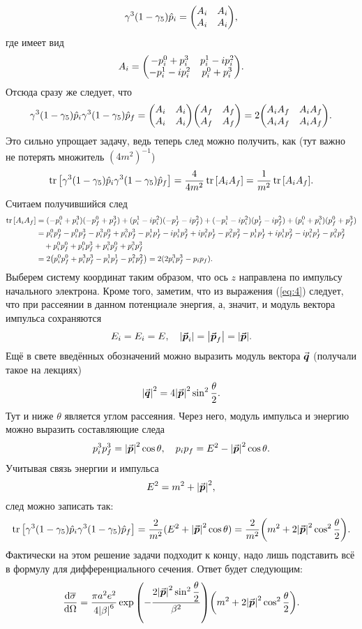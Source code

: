 \documentclass[12pt]{article}
\begin{document}
	$$ \gamma^3(1-\gamma_5)\hat{p}_i = \mqty(A_i & A_i \\ A_i & A_i), $$
	где имеет вид
	$$ A_i = \mqty(-p^0_i + p^3_i & p^1_i - ip^2_i \\ -p^1_i - ip^2_i & p^0_i + p^3_i).$$
	Отсюда сразу же следует, что 
	$$ \gamma^3(1-\gamma_5)\hat{p}_i \gamma^3(1-\gamma_5)\hat{p}_f = \mqty(A_i & A_i \\ A_i & A_i) \mqty(A_f & A_f \\ A_f & A_f) = 2 \mqty(A_i A_f &A_i A_f \\ A_i A_f & A_i A_f).$$
	Это сильно упрощает задачу, ведь теперь след можно получить, как (тут важно не потерять множитель $(4m^2)^{-1}$)
	$$ \tr\qty[\gamma^3(1-\gamma_5)\hat{p}_i \gamma^3(1-\gamma_5)\hat{p}_f] = \dfrac{4}{4m^2} \tr\qty[A_i A_f] = \dfrac{1}{m^2}\tr\qty[A_i A_f]. $$
	Считаем получившийся след 
	\begin{equation*}
		\begin{split}
			\tr\qty[A_i A_f] &= (-p^0_i + p^3_i) (-p^0_f + p^3_f) + (p^1_i - ip^2_i) (-p^1_f - ip^2_f) + (-p^1_i - ip^2_i) (p^1_f - ip^2_f) + (p^0_i + p^3_i) (p^0_f + p^3_f)\\
			&= p^0_i p^0_f - p^0_i p^3_f - p^3_i p^0_f + p^3_i p^3_f - p^1_i p^1_f - i p^1_i p^2_f + i p^2_i p^1_f - p^2_i p^2_f - p^1_i p^1_f + ip^1_i p^2_f - ip^2_i p^1_f - p^2_i p^2_f\\
			&\quad+ p^0_i p^0_f + p^0_i p^3_f + p^3_i p^0_f + p^3_i p^3_f\\
			&= 2 \qty(p^0_i p^0_f + p^3_i p^3_f - p^1_i p^1_f - p^2_i p^2_f) = 2(2p^3_i p^3_f - p_ip_f). 
 		\end{split}
	\end{equation*}
	Выберем систему координат таким образом, что ось $z$ направлена по импульсу начального электрона. Кроме того, заметим, что из выражения (\ref{eq:4}) следует, что при рассеянии в данном потенциале энергия, а, значит, и модуль вектора импульса сохраняются
	$$ E_i = E_i = E,\quad \abs{\va*{p}_i} = \abs{\va*{p}_f} = \abs{\va*{p}}. $$
	Ещё в свете введённых обозначений можно выразить модуль вектора $\va*{q}$ (получали такое на лекциях)
	$$ \abs{\va*{q}}^2 = 4 \abs{\va*{p}}^2 \sin^2{\dfrac{\theta}{2}}. $$
	Тут и ниже $\theta$ является углом рассеяния. Через него, модуль импульса и энергию можно выразить составляющие следа
	$$ p^3_i p^3_f = \abs{\va*{p}}^2 \cos{\theta},\quad p_ip_f = E^2 - \abs{\va*{p}}^2 \cos{\theta}.$$
	Учитывая связь энергии и импульса
	$$ E^2 = m^2 + \abs{\va*{p}}^2, $$
	след можно записать так:
	$$ \tr\qty[\gamma^3(1-\gamma_5)\hat{p}_i \gamma^3(1-\gamma_5)\hat{p}_f] = \dfrac{2}{m^2} (E^2 + \abs{\va*{p}}^2 \cos{\theta}) = \dfrac{2}{m^2} \qty(m^2 + 2\abs{\va*{p}}^2 \cos^2{\dfrac\theta2}).$$
	Фактически на этом решение задачи подходит к концу, надо лишь подставить всё в формулу для дифференциального сечения. Ответ будет следующим:
	\begin{equation}
		\dv{\overline{\sigma}}{\Omega} = \dfrac{\pi a^2 e^2}{4\abs{\beta}^6} \exp\qty(-\dfrac{2 \abs{\va*{p}}^2 \sin^2{\dfrac{\theta}{2}}}{\beta^2}) \qty(m^2 + 2\abs{\va*{p}}^2 \cos^2{\dfrac\theta2}).
	\end{equation}
	
\end{document}
